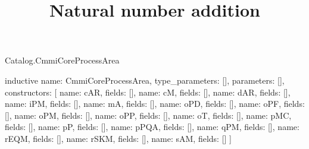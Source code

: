 \begin{lexlean}{Catalog.CmmiCoreProcessArea}
\title{Natural number addition}
\begin{semanticmodule}
inductive{
  name: CmmiCoreProcessArea,
  type_parameters: [],
  parameters: [],
  constructors: [
    {name: cAR, fields: []},
    {name: cM, fields: []},
    {name: dAR, fields: []},
    {name: iPM, fields: []},
    {name: mA, fields: []},
    {name: oPD, fields: []},
    {name: oPF, fields: []},
    {name: oPM, fields: []},
    {name: oPP, fields: []},
    {name: oT, fields: []},
    {name: pMC, fields: []},
    {name: pP, fields: []},
    {name: pPQA, fields: []},
    {name: qPM, fields: []},
    {name: rEQM, fields: []},
    {name: rSKM, fields: []},
    {name: sAM, fields: []}
  ]
}
\end{semanticmodule}
\end{lexlean}
